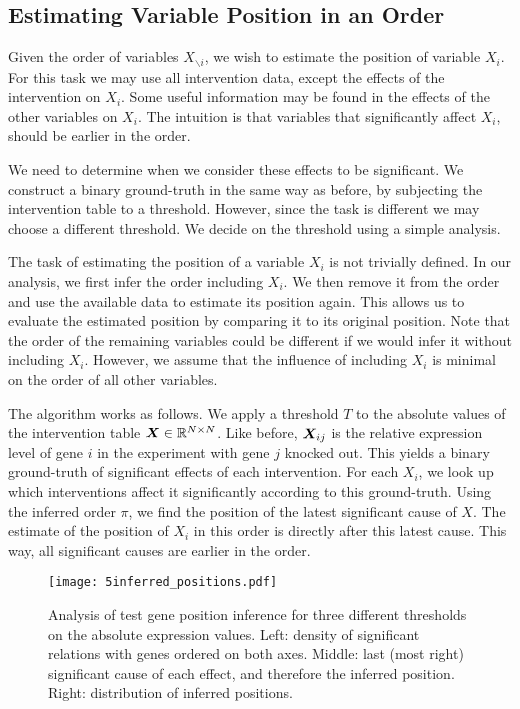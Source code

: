 \subsection{Estimating Variable Position in an Order}

Given the order of variables $X_{\backslash i}$, we wish to estimate the position of variable $X_i$. For this task we may use all intervention data, except the effects of the intervention on $X_i$. Some useful information may be found in the effects of the other variables on $X_i$. The intuition is that variables that significantly affect $X_i$, should be earlier in the order. 

We need to determine when we consider these effects to be significant. We construct a binary ground-truth in the same way as before, by subjecting the intervention table to a threshold. However, since the task is different we may choose a different threshold. We decide on the threshold using a simple analysis.

The task of estimating the position of a variable $X_i$ is not trivially defined. In our analysis, we first infer the order including $X_i$. We then remove it from the order and use the available data to estimate its position again. This allows us to evaluate the estimated position by comparing it to its original position. Note that the order of the remaining variables could be different if we would infer it without including $X_i$. However, we assume that the influence of including $X_i$ is minimal on the order of all other variables. 

The algorithm works as follows. We apply a threshold $T$ to the absolute values of the intervention table $\bm{X} \in \mathbb{R}^{N\times N}$. Like before, $\bm{X}_{ij}$ is the relative expression level of gene $i$ in the experiment with gene $j$ knocked out. This yields a binary ground-truth of significant effects of each intervention. For each $X_i$, we look up which interventions affect it significantly according to this ground-truth. Using the inferred order $\pi$, we find the position of the latest significant cause of $X$. The estimate of the position of $X_i$ in this order is directly after this latest cause. This way, all significant causes are earlier in the order.

\begin{figure}[]
    \centering
    \texttt{[image: 5inferred\_positions.pdf]}
    \caption{Analysis of test gene position inference for three different thresholds on the absolute expression values. Left: density of significant relations with genes ordered on both axes. Middle: last (most right) significant cause of each effect, and therefore the inferred position. Right: distribution of inferred positions.}
    \label{fig:5:positions}
\end{figure}

